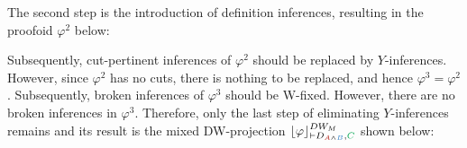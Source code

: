 \begin{example}
The second step is the introduction of definition inferences, resulting in the proofoid $\varphi^2$ below:

\begin{prooftree}
		 
	 
	 
						 
					 
					 
									 
								 
\end{prooftree}

Subsequently, cut-pertinent inferences of $\varphi^2$ should be replaced by $Y$-inferences. However, since $\varphi^2$ has no cuts, there is nothing to be replaced, and hence $\varphi^3 = \varphi^2$. Subsequently, broken inferences of $\varphi^3$ should be W-fixed. However, there are no broken inferences in $\varphi^3$. Therefore, only the last step of eliminating $Y$-inferences remains and its result is the mixed DW-projection $\projectionDWMixed{\varphi}{\seq D_{\hA{A} \structplus \hB{B}} , \hE{C}}$ shown below:

\begin{prooftree}
		 
	 
	 
							 
\end{prooftree}

\end{example}



